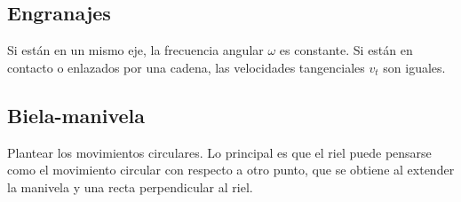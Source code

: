 \newpage
\subsection*{Engranajes}

Si están en un mismo eje, la frecuencia angular $\omega$ es constante. Si están en contacto o enlazados por una cadena, las velocidades tangenciales $v_t$ son iguales.


\subsection*{Biela-manivela}

Plantear los movimientos circulares. Lo principal es que el riel puede pensarse como el movimiento circular con respecto a otro punto, que se obtiene al extender la manivela y una recta perpendicular al riel.